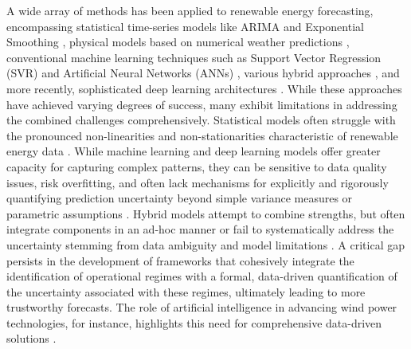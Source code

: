 \documentclass[review,3p,times]{elsarticle}
\begin{document}
A wide array of methods has been applied to renewable energy forecasting, encompassing statistical time-series models like ARIMA and Exponential Smoothing \cite{wu2021ensemble, alkandari2024solar}, physical models based on numerical weather predictions \cite{bauer2015quiet}, conventional machine learning techniques such as Support Vector Regression (SVR) and Artificial Neural Networks (ANNs) \cite{mahmud2021machine, akhter2019review}, various hybrid approaches \cite{moosavi2019learning, lin2018multi, gu2025explainable}, and more recently, sophisticated deep learning architectures \cite{hu2024temporal, qiu2024novel, wang2024adaptive, xu2025deep, wang2025novel}. While these approaches have achieved varying degrees of success, many exhibit limitations in addressing the combined challenges comprehensively. Statistical models often struggle with the pronounced non-linearities and non-stationarities characteristic of renewable energy data \cite{wu2021ensemble}. While machine learning and deep learning models offer greater capacity for capturing complex patterns, they can be sensitive to data quality issues, risk overfitting, and often lack mechanisms for explicitly and rigorously quantifying prediction uncertainty beyond simple variance measures or parametric assumptions \cite{mahmud2021machine, ibrahim2022machine}. Hybrid models attempt to combine strengths, but often integrate components in an ad-hoc manner or fail to systematically address the uncertainty stemming from data ambiguity and model limitations \cite{moonchai2020short}. A critical gap persists in the development of frameworks that cohesively integrate the identification of operational regimes with a formal, data-driven quantification of the uncertainty associated with these regimes, ultimately leading to more trustworthy forecasts. The role of artificial intelligence in advancing wind power technologies, for instance, highlights this need for comprehensive data-driven solutions \cite{wang2023tracking}.
\end{document}
